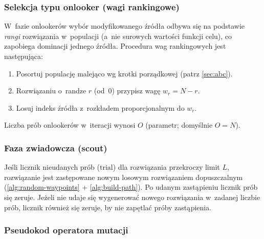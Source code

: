 \subsubsection{Selekcja typu onlooker (wagi rankingowe)}
\label{sec:onlookers}

W~fazie onlookerów wybór modyfikowanego źródła odbywa się na podstawie
\emph{rangi} rozwiązania w~populacji (a~nie surowych wartości funkcji celu),
co zapobiega dominacji jednego źródła. Procedura wag rankingowych jest
następująca:

\begin{enumerate}
    \item Posortuj populację malejąco wg krotki porządkowej (patrz
          \cref{sec:abc}).
    \item Rozwiązaniu o~randze $r$ (od~0) przypisz wagę $w_r = N - r$.
    \item Losuj indeks źródła z~rozkładem proporcjonalnym do $w_r$.
\end{enumerate}

Liczba prób onlookerów w~iteracji wynosi $O$ (parametr; domyślnie
$O = N$).

\subsubsection{Faza zwiadowcza (scout)}
\label{sec:scouts}

Jeśli licznik nieudanych prób ($\mathrm{trial}$) dla rozwiązania przekroczy
limit $L$, rozwiązanie jest zastępowane nowym losowym rozwiązaniem
dopuszczalnym (\cref{alg:random-waypoints} + \cref{alg:build-path}). Po
udanym zastąpieniu licznik prób się zeruje. Jeżeli nie udaje się
wygenerować nowego rozwiązania w~zadanej liczbie prób, licznik również się
zeruje, by nie zapętlać próby zastąpienia.

\subsubsection{Pseudokod operatora mutacji}
\label{sec:mutate-pseudo}

